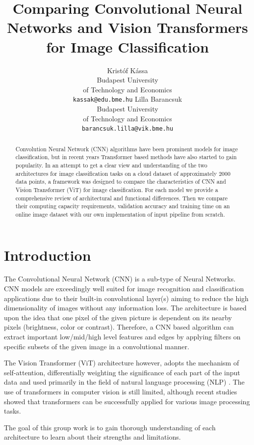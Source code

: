 \documentclass{article}
\title{Comparing Convolutional Neural Networks and Vision Transformers for Image Classification}
\author{
  Krist\'of K\'assa \\  
  Budapest University \\
  of Technology and Economics\\
  \texttt{kassak@edu.bme.hu}
  \And
  Lilla Barancsuk \\
  Budapest University \\ 
  of Technology and Economics\\
  \texttt{barancsuk.lilla@vik.bme.hu} \\
}
\begin{document}
\maketitle

\begin{abstract}
Convolution Neural Network (CNN) algorithms have been prominent models for image classification, but in recent years Transformer based methods have also started to gain popularity. In an attempt to get a clear view and understanding of the two architectures for image classification tasks on a cloud dataset of approximately 2000 data points, a framework was designed to compare the characteristics of CNN and Vision Transformer (ViT) for image classification. For each model we provide a comprehensive review of architectural and functional differences. Then we compare their computing capacity requirements, validation accuracy and training time on an online image dataset with our own implementation of input pipeline from scratch.
\end{abstract}

\section{Introduction}
The Convolutional Neural Network (CNN) is a sub-type of Neural Networks. CNN \cite{Krizhevsky2012,LeCun1989} models are exceedingly well suited for image recognition and classification applications due to their built-in convolutional layer(s) aiming to reduce the high dimensionality of images without any information loss. The architecture is based upon the idea that one pixel of the given picture is dependent on its nearby pixels (brightness, color or contrast). Therefore, a CNN based algorithm can extract important low/mid/high level features \cite{Zeiler2014} and edges by applying filters on specific subsets of the given image in a convolutional manner. 

The Vision Transformer (ViT) architecture however, adopts the mechanism of self-attention, differentially weighting the significance of each part of the input data and used primarily in the field of natural language processing (NLP) \cite{Vaswani2017}. The use of transformers in computer vision is still limited, although recent studies showed that transformers can be successfully applied for various image processing tasks. 

The goal of this group work is to gain thorough understanding of each architecture to learn about their strengths and limitations.
\end{document}
